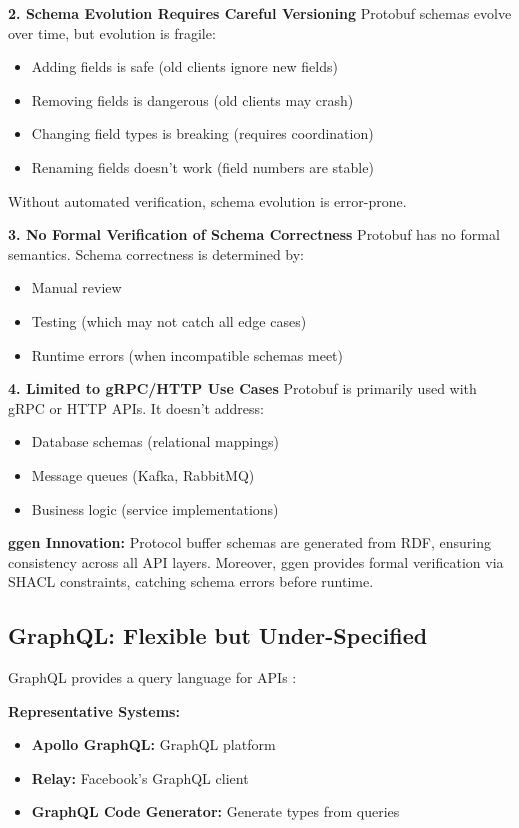 \textbf{2. Schema Evolution Requires Careful Versioning}
Protobuf schemas evolve over time, but evolution is fragile:
\begin{itemize}
    \item Adding fields is safe (old clients ignore new fields)
    \item Removing fields is dangerous (old clients may crash)
    \item Changing field types is breaking (requires coordination)
    \item Renaming fields doesn't work (field numbers are stable)
\end{itemize}

Without automated verification, schema evolution is error-prone.

\textbf{3. No Formal Verification of Schema Correctness}
Protobuf has no formal semantics. Schema correctness is determined by:
\begin{itemize}
    \item Manual review
    \item Testing (which may not catch all edge cases)
    \item Runtime errors (when incompatible schemas meet)
\end{itemize}

\textbf{4. Limited to gRPC/HTTP Use Cases}
Protobuf is primarily used with gRPC or HTTP APIs. It doesn't address:
\begin{itemize}
    \item Database schemas (relational mappings)
    \item Message queues (Kafka, RabbitMQ)
    \item Business logic (service implementations)
\end{itemize}

\textbf{ggen Innovation:} Protocol buffer schemas are generated from RDF, ensuring consistency across all API layers. Moreover, ggen provides formal verification via SHACL constraints, catching schema errors before runtime.

\subsection{GraphQL: Flexible but Under-Specified}

GraphQL provides a query language for APIs \cite{graphql2018}:

\textbf{Representative Systems:}
\begin{itemize}
    \item \textbf{Apollo GraphQL:} GraphQL platform
    \item \textbf{Relay:} Facebook's GraphQL client
    \item \textbf{GraphQL Code Generator:} Generate types from queries
\end{itemize}

